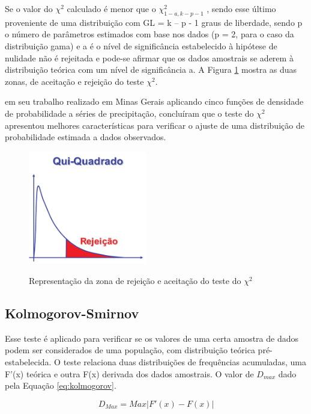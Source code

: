 Se o valor do $\chi^2$  calculado é menor que o $\chi^2_{1 - a, k- p - 1}$ , sendo esse último proveniente de uma distribuição com GL = k – p - 1 graus de liberdade, sendo p o número de parâmetros estimados com base nos dados (p = 2, para o caso da distribuição gama) e a é o nível de significância estabelecido à hipótese de nulidade não é rejeitada e pode-se afirmar que os dados amostrais se aderem à distribuição teórica com um nível de significância a. A Figura \ref{fig:qui-quadrado} mostra as duas zonas, de aceitação e rejeição do teste $\chi^2$.

 em seu trabalho realizado em Minas Gerais aplicando cinco funções de densidade de probabilidade a séries de precipitação, concluíram que o teste do $\chi^2$  apresentou melhores características para verificar o ajuste de uma distribuição de probabilidade estimada a dados observados.

\begin{figure}[h]
    \caption{Representação da zona de rejeição e aceitação do teste do $\chi^2$}
    \centering
    \includegraphics[width=0.46\textwidth]{Textuais/Figuras/qui-quadrado.pdf}
    \label{fig:qui-quadrado}
\end{figure}

\subsection{Kolmogorov-Smirnov}

Esse teste é aplicado para verificar se os valores de uma certa amostra de dados podem ser considerados de uma população, com distribuição teórica pré-estabelecida.
O teste relaciona duas distribuições de frequências acumuladas, uma F’(x) teórica e outra F(x) derivada dos dados amostrais. O valor de $D_{max}$ dado pela Equação \ref{eq:kolmogorov}.

\begin{equation}
\label{eq:kolmogorov}
    D_{Max} = Max|F'(x) - F(x)|
\end{equation}

